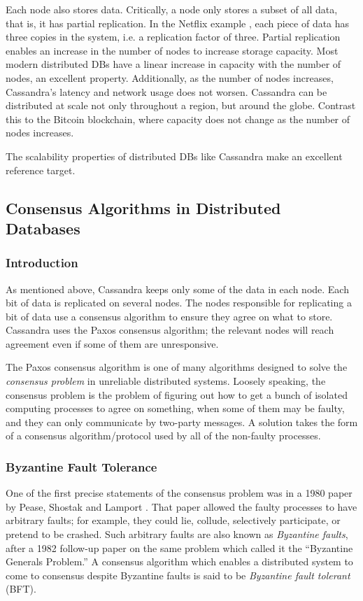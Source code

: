 Each node also stores data.
Critically, a node only stores a subset of all data, that is, it has partial replication.
In the Netflix example \cite{kalantzis_netflix}, each piece of data has three copies in the system, i.e. a replication factor of three.
Partial replication enables an increase in the number of nodes to increase storage capacity.
Most modern distributed DBs have a linear increase in capacity with the number of nodes, an excellent property.
Additionally, as the number of nodes increases, Cassandra’s latency and network usage does not worsen.
Cassandra can be distributed at scale not only throughout a region, but around the globe.
Contrast this to the Bitcoin blockchain, where capacity does not change as the number of nodes increases.

The scalability properties of distributed DBs like Cassandra make an excellent reference target.

\subsection{Consensus Algorithms in Distributed Databases}\label{subsec:consensus}
\subsubsection{Introduction}
As mentioned above, Cassandra keeps only some of the data in each node. Each bit of data is replicated on several nodes. The nodes responsible for replicating a bit of data use a consensus algorithm to ensure they agree on what to store. Cassandra uses the Paxos consensus algorithm; the relevant nodes will reach agreement even if some of them are unresponsive.

The Paxos consensus algorithm is one of many algorithms designed to solve the \emph{consensus problem} in unreliable distributed systems. Loosely speaking, the consensus problem is the problem of figuring out how to get a bunch of isolated computing processes to agree on something, when some of them may be faulty, and they can only communicate by two-party messages. A solution takes the form of a consensus algorithm/protocol used by all of the non-faulty processes.

\subsubsection{Byzantine Fault Tolerance}
One of the first precise statements of the consensus problem was in a 1980 paper by Pease, Shostak and Lamport \cite{pease1980reaching,lamport_writings}. That paper allowed the faulty processes to have arbitrary faults; for example, they could lie, collude, selectively participate, or pretend to be crashed. Such arbitrary faults are also known as \emph{Byzantine faults}, after a 1982 follow-up paper on the same problem \cite{lamport1982byzantine} which called it the ``Byzantine Generals Problem.'' A consensus algorithm which enables a distributed system to come to consensus despite Byzantine faults is said to be \emph{Byzantine fault tolerant} (BFT).

